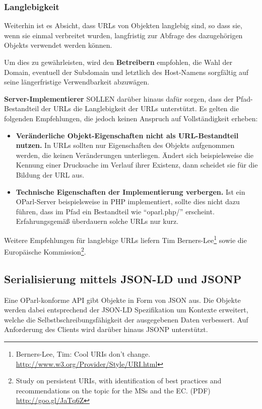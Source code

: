 \documentclass[,a4paper]{article}
\begin{document}
\subsubsection{Langlebigkeit}\label{langlebigkeit}

Weiterhin ist es Absicht, dass URLs von Objekten langlebig sind, so dass
sie, wenn sie einmal verbreitet wurden, langfristig zur Abfrage des
dazugehörigen Objekts verwendet werden können.

Um dies zu gewährleisten, wird den \textbf{Betreibern} empfohlen, die
Wahl der Domain, eventuell der Subdomain und letztlich des Host-Namens
sorgfältig auf seine längerfristige Verwendbarkeit abzuwägen.

\textbf{Server-Implementierer} SOLLEN darüber hinaus dafür sorgen, dass
der Pfad-Bestandteil der URLs die Langlebigkeit der URLs unterstützt. Es
gelten die folgenden Empfehlungen, die jedoch keinen Anspruch auf
Vollständigkeit erheben:

\begin{itemize}
\item
  \textbf{Veränderliche Objekt-Eigenschaften nicht als URL-Bestandteil
  nutzen.} In URLs sollten nur Eigenschaften des Objekts aufgenommen
  werden, die keinen Veränderungen unterliegen. Ändert sich
  beispielsweise die Kennung einer Drucksache im Verlauf ihrer Existenz,
  dann scheidet sie für die Bildung der URL aus.
\item
  \textbf{Technische Eigenschaften der Implementierung verbergen.} Ist
  ein OParl-Server beispielsweise in PHP implementiert, sollte dies
  nicht dazu führen, dass im Pfad ein Bestandteil wie ``oparl.php/''
  erscheint. Erfahrungsgemäß überdauern solche URLs nur kurz.
\end{itemize}

Weitere Empfehlungen für langlebige URLs liefern Tim
Berners-Lee\footnote{Berners-Lee, Tim: Cool URIs don't change.
  \url{http://www.w3.org/Provider/Style/URI.html}} sowie die Europäische
Kommission\footnote{Study on persistent URIs, with identification of
  best practices and recommendations on the topic for the MSs and the
  EC. (PDF) \url{http://goo.gl/JaTq6Z}}.

\subsection{Serialisierung mittels JSON-LD und
JSONP}\label{serialisierung-mittels-json-ld-und-jsonp}

Eine OParl-konforme API gibt Objekte in Form von JSON aus. Die Objekte
werden dabei entsprechend der JSON-LD Spezifikation um Kontexte
erweitert, welche die Selbstbschreibungsfähigkeit der ausgegebenen Daten
verbessert. Auf Anforderung des Clients wird darüber hinaus JSONP
unterstützt.
\end{document}
